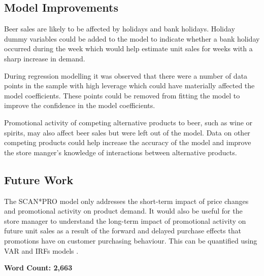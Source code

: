 \documentclass[a4paper,11pt]{article}
\begin{document}
\subsection{Model Improvements}
Beer sales are likely to be affected by holidays and bank holidays. Holiday dummy variables could be added to the model to indicate whether a bank holiday occurred during the week which would help estimate unit sales for weeks with a sharp increase in demand.

During regression modelling it was observed that there were a number of data points in the sample with high leverage which could have materially affected the model coefficients. These points could be removed from fitting the model to improve the confidence in the model coefficients. 

Promotional activity of competing alternative products to beer, such as wine or spirits, may also affect beer sales but were left out of the model. Data on other competing products could help increase the accuracy of the model and improve the store manger's knowledge of interactions between alternative products.

\subsection{Future Work}
The SCAN*PRO model only addresses the short-term impact of price changes and promotional activity on product demand. It would also be useful for the store manager to understand the long-term impact of promotional activity on future unit sales as a result of the forward and delayed purchase effects that promotions have on customer purchasing behaviour. This can be quantified using VAR and IRFs models \citep{srinivasan_promotions_2004}.  


\textbf{Word Count: 2,663}



\end{document}
